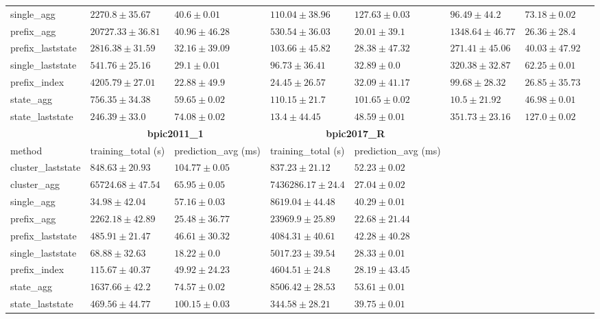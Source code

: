 \begin{table}[!htbp]
{\begin{tabular}{llllllll}
			single\_agg & $2270.8 \pm 35.67$ & $40.6 \pm 0.01$ & $110.04 \pm 38.96$ & $127.63 \pm 0.03$ & $96.49 \pm 44.2$ & $73.18 \pm 0.02$ \\ 
			prefix\_agg & $20727.33 \pm 36.81$ & $40.96 \pm 46.28$ & $530.54 \pm 36.03$ & $\mathbf{20.01 \pm 39.1}$ & $1348.64 \pm 46.77$ & $\mathbf{26.36 \pm 28.4}$ \\ 
			prefix\_laststate & $2816.38 \pm 31.59$ & $32.16 \pm 39.09$ & $103.66 \pm 45.82$ & $28.38 \pm 47.32$ & $271.41 \pm 45.06$ & $40.03 \pm 47.92$ \\ 
			single\_laststate & $541.76 \pm 25.16$ & $29.1 \pm 0.01$ & $96.73 \pm 36.41$ & $32.89 \pm 0.0$ & $320.38 \pm 32.87$ & $62.25 \pm 0.01$ \\ 
			prefix\_index & $4205.79 \pm 27.01$ & $\mathbf{22.88 \pm 49.9}$ & $24.45 \pm 26.57$ & $32.09 \pm 41.17$ & $99.68 \pm 28.32$ & $26.85 \pm 35.73$ \\ 
			state\_agg & $756.35 \pm 34.38$ & $59.65 \pm 0.02$ & $110.15 \pm 21.7$ & $101.65 \pm 0.02$ & $\mathbf{10.5 \pm 21.92}$ & $46.98 \pm 0.01$ \\ 
			state\_laststate & $\mathbf{246.39 \pm 33.0}$ & $74.08 \pm 0.02$ & $\mathbf{13.4 \pm 44.45}$ & $48.59 \pm 0.01$ & $351.73 \pm 23.16$ & $127.0 \pm 0.02$ \\ 
			\bottomrule
			\toprule
			& \multicolumn{2}{c}{{\bfseries bpic2011\_1}} & \multicolumn{2}{c}{{\bfseries bpic2017\_R}} \\ \cmidrule(lr){2-3} \cmidrule(lr){4-5} \cmidrule(lr){6-7}
			method  & training\_total (s) & prediction\_avg (ms) & training\_total (s) & prediction\_avg (ms) \\ \midrule
			cluster\_laststate & $848.63 \pm 20.93$ & $104.77 \pm 0.05$ & $837.23 \pm 21.12$ & $52.23 \pm 0.02$ \\ 
			cluster\_agg & $65724.68 \pm 47.54$ & $65.95 \pm 0.05$ & $7436286.17 \pm 24.4$ & $27.04 \pm 0.02$ \\ 
			single\_agg & $\mathbf{34.98 \pm 42.04}$ & $57.16 \pm 0.03$ & $8619.04 \pm 44.48$ & $40.29 \pm 0.01$ \\ 
			prefix\_agg & $2262.18 \pm 42.89$ & $25.48 \pm 36.77$ & $23969.9 \pm 25.89$ & $\mathbf{22.68 \pm 21.44}$ \\ 
			prefix\_laststate & $485.91 \pm 21.47$ & $46.61 \pm 30.32$ & $4084.31 \pm 40.61$ & $42.28 \pm 40.28$ \\ 
			single\_laststate & $68.88 \pm 32.63$ & $\mathbf{18.22 \pm 0.0}$ & $5017.23 \pm 39.54$ & $28.33 \pm 0.01$ \\ 
			prefix\_index & $115.67 \pm 40.37$ & $49.92 \pm 24.23$ & $4604.51 \pm 24.8$ & $28.19 \pm 43.45$ \\ 
			state\_agg & $1637.66 \pm 42.2$ & $74.57 \pm 0.02$ & $8506.42 \pm 28.53$ & $53.61 \pm 0.01$ \\ 
			state\_laststate & $469.56 \pm 44.77$ & $100.15 \pm 0.03$ & $\mathbf{344.58 \pm 28.21}$ & $39.75 \pm 0.01$ \\ 
			\bottomrule
			
		\end{tabular}%
	}
	
	
\end{table}



